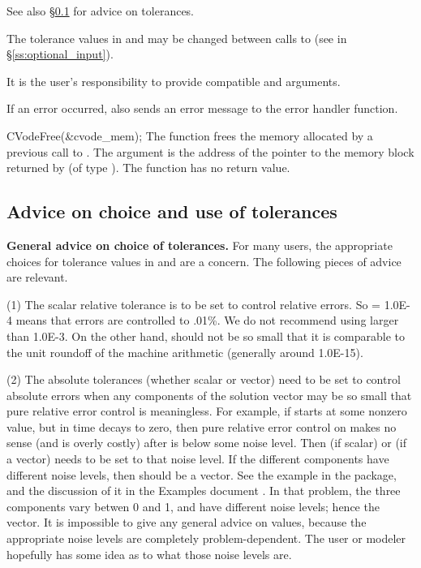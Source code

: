 {
  See also \S\ref{sss:tol_advice} for advice on tolerances.

  The tolerance values in  and  may be changed between
  calls to  (see  in \S\ref{ss:optional_input}).

  {\warn}It is the user's responsibility to provide compatible  and
   arguments.

  If an error occurred,  also sends an error message to the
  error handler function.
}
{
  CVodeFree(\&cvode\_mem);
}
{
  The function  frees the memory allocated by
  a previous call to .
}
{
  The argument is the address of the pointer to the {\cvode} memory block
  returned by  (of type ).
}
{
  The function  has no return value.
}
{}


\subsection{Advice on choice and use of tolerances}\label{sss:tol_advice}

{\bf General advice on choice of tolerances.}
For many users, the appropriate choices for tolerance values in
 and  are a concern.  The following pieces of
advice are relevant.

(1) The scalar relative tolerance  is to be set to control relative
errors.  So  = 1.0E-4 means that errors are controlled to .01\%.  We
do not recommend using  larger than 1.0E-3.  On the other hand,
 should not be so small that it is comparable to the unit roundoff
of the machine arithmetic (generally around 1.0E-15).

(2) The absolute tolerances  (whether scalar or vector) need to
be set to control absolute errors when any components of the solution
vector  may be so small that pure relative error control is
meaningless.  For example, if  starts at some nonzero value, but in time
decays to zero, then pure relative error control on  makes no sense
(and is overly costly) after  is below some noise level.  Then
 (if scalar) or  (if a vector) needs to be set to that
noise level.  If the different components have different noise levels,
then  should be a vector.  See the example  in the {\cvode}
package, and the discussion of it in the {\cvode} Examples document
\cite{cvode2.4.0_ex}.
In that problem, the three components vary betwen 0 and 1, and have
different noise levels; hence the  vector.  It is impossible to
give any general advice on  values, because the appropriate noise
levels are completely problem-dependent.  The user or modeler hopefully has
some idea as to what those noise levels are.

